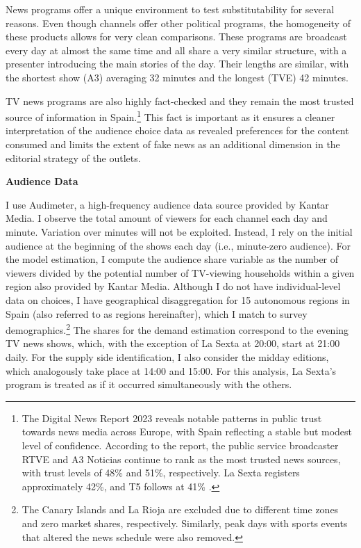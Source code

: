 \documentclass[12pt]{article}
\begin{document}
		News programs offer a unique environment to test substitutability for several reasons. Even though channels offer other political programs, the homogeneity of these products allows for very clean comparisons. These programs are broadcast every day at almost the same time and all share a very similar structure, with a presenter introducing the main stories of the day. Their lengths are similar, with the shortest show (A3) averaging 32 minutes and the longest (TVE) 42 minutes.
		
		TV news programs are also highly fact-checked and they remain the most trusted source of information in Spain.\footnote{The Digital News Report 2023 reveals notable patterns in public trust towards news media across Europe, with Spain reflecting a stable but modest level of confidence. According to the report, the public service broadcaster RTVE and A3 Noticias continue to rank as the most trusted news sources, with trust levels of 48\% and 51\%, respectively. La Sexta registers  approximately 42\%, and T5 follows at 41\% \citep{reuters_dnr_2023}.} This fact is important as it ensures a cleaner interpretation of the audience choice data as revealed preferences for the content consumed and limits the extent of fake news as an additional dimension in the editorial strategy of the outlets. 
		
	
	\textbf{Audience Data}
	
	I use Audimeter, a high-frequency audience data source provided by Kantar Media. I observe the total amount of viewers for each channel  each day and minute. Variation over minutes will not be exploited. Instead, I rely on the initial audience at the beginning of the shows each day (i.e., minute-zero audience). For the model estimation, I compute the audience share variable  as the number of viewers divided by the potential number of TV-viewing households within a given region also provided by Kantar Media. 
	Although I do not have individual-level data on choices, I have geographical disaggregation for 15 autonomous regions in Spain (also referred to as regions hereinafter), which I match to survey demographics.\footnote{The Canary Islands and La Rioja are excluded due to different time zones and zero market shares, respectively. Similarly, peak days with sports events that altered the news schedule were also removed.} The shares for the demand estimation correspond to the evening TV news shows, which, with the exception of La Sexta at 20:00, start at 21:00 daily. For the supply side identification, I also consider the midday editions, which analogously take place at 14:00 and 15:00.	For this analysis, La Sexta’s program is treated as if it occurred simultaneously with the others.
	
\end{document}

